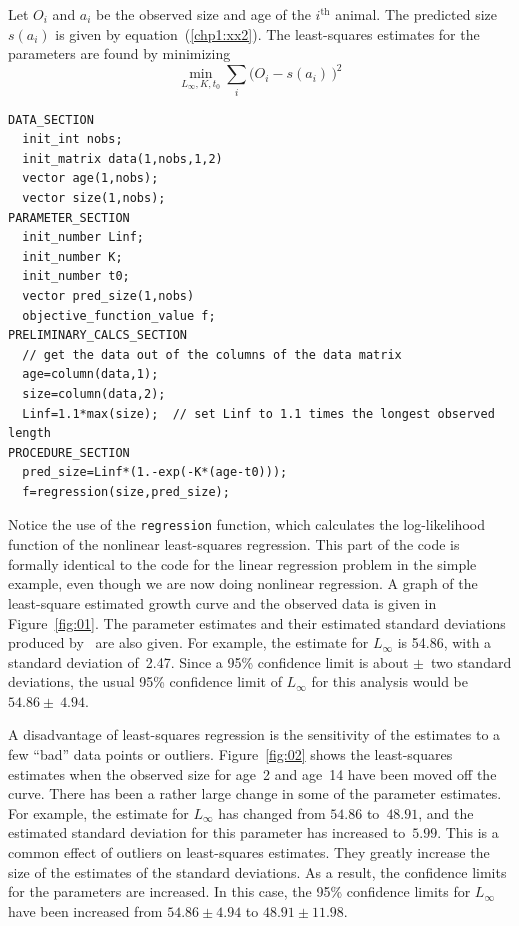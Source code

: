 \documentclass{admbmanual}
\begin{document}
Let $O_i$ and $a_i$ be the observed size and age of the $i^\textrm{th}$
animal. The predicted size $s(a_i)$ is given by equation~(\ref{chp1:xx2}).
The least-squares estimates for the parameters are found by minimizing
\begin{equation*}
  \min_{L_\infty,K,t_0} \sum_i \big(O_i -s(a_i)\,\big)^2
\end{equation*}
\begin{lstlisting}
DATA_SECTION
  init_int nobs;
  init_matrix data(1,nobs,1,2)
  vector age(1,nobs);
  vector size(1,nobs);
PARAMETER_SECTION
  init_number Linf;
  init_number K;
  init_number t0;
  vector pred_size(1,nobs)
  objective_function_value f;
PRELIMINARY_CALCS_SECTION
  // get the data out of the columns of the data matrix 
  age=column(data,1);
  size=column(data,2);
  Linf=1.1*max(size);  // set Linf to 1.1 times the longest observed length
PROCEDURE_SECTION
  pred_size=Linf*(1.-exp(-K*(age-t0)));
  f=regression(size,pred_size);
\end{lstlisting}
Notice the use of the 
\texttt{regression} function, which calculates the
log-likelihood function of the nonlinear least-squares regression. 
 This part of the code is formally
identical to the code for the linear regression problem in the
simple example, even though we are now doing nonlinear regression.
A graph of the least-square estimated growth curve and the observed
data is given in Figure~\ref{fig:01}. The parameter estimates and their estimated 
standard deviations produced by \ADM\ are also given.
For example, the estimate for $L_\infty$ is  54.86, with a standard
deviation of~2.47. Since a 95\% confidence limit is about 
$\pm$~two standard deviations, the usual 95\% confidence limit of
$L_\infty$ for this analysis would be $54.86\pm~4.94$.

A disadvantage of least-squares regression is the sensitivity of the 
estimates to a few ``bad'' data points or outliers. Figure~\ref{fig:02} shows the
least-squares estimates when the observed size for age~2 and age~14
have been moved off the curve.
There has been a rather large change in some of the parameter
estimates. For example, the estimate for $L_\infty$ has changed
from $54.86$ to~$48.91$, and the estimated standard deviation for
this parameter has increased to~$5.99$.
This is a common effect of outliers on least-squares estimates.
They greatly increase the size of the estimates of the standard deviations.
As a result, the confidence limits for the parameters are increased.
In this case, the 95\% confidence limits  for 
$L_\infty$ have been increased from $54.86\pm 4.94$ to $48.91\pm 11.98$.
\end{document}

